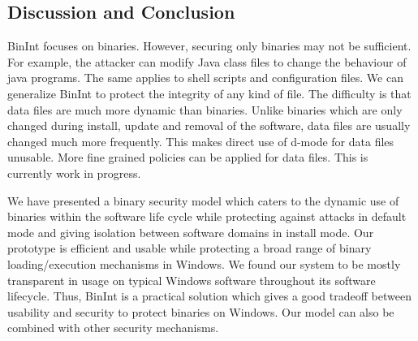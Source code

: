 \subsection{Discussion and Conclusion}
\label{sec:conc}

BinInt focuses on binaries.
However, securing only binaries may not be sufficient.
For example, the attacker can modify Java class files to
change the behaviour of java programs.
The same applies to shell scripts and configuration files.
We can generalize BinInt to protect the integrity of any kind of file.
The difficulty is that data files are much more dynamic than binaries.
Unlike binaries which are only changed during install, update and removal
of the software, data files are usually changed much more frequently.
This makes direct use of d-mode for data files unusable.
More fine grained policies can be applied for data files.
This is currently work in progress.

We have presented a binary security model which caters to the
dynamic use of binaries within the software life cycle
while protecting against attacks in default mode
and giving isolation between software domains in install mode.
Our prototype is efficient and usable while
protecting a broad range of binary loading/execution mechanisms in Windows.
We found our system to be mostly transparent in usage on typical
Windows software throughout its software lifecycle.
Thus, BinInt is a practical solution
which gives a good tradeoff between usability and security
to protect binaries on Windows.
Our model can also be combined with other security mechanisms.

